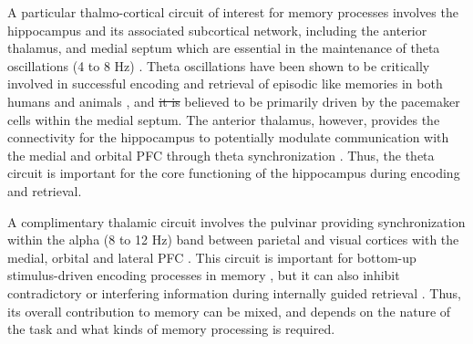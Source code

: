 \documentclass[11pt, titlepage, twoside]{article}
\providecommand{\DIFadd}[1]{{\protect\color{blue}\uwave{#1}}} %
\providecommand{\DIFdel}[1]{{\protect\color{red}\sout{#1}}}                      %
\providecommand{\DIFaddbegin}{} %
\providecommand{\DIFaddend}{} %
\providecommand{\DIFdelbegin}{} %
\providecommand{\DIFdelend}{} %
\begin{document}
A particular thalmo-cortical circuit of interest for memory processes involves the hippocampus and its associated subcortical network, including the anterior thalamus, and medial septum which are essential in the maintenance of theta oscillations (4 to 8 Hz) \cite{Buzsaki02}.  Theta oscillations have been shown to be critically involved in successful encoding and retrieval of episodic like memories in both humans and animals \cite{NyhusCurran10,JonesWilson05,FuentemillaBarnesDuzelEtAl14}, and \DIFdelbegin \DIFdel{it is }\DIFdelend \DIFaddbegin \DIFadd{are }\DIFaddend believed to be primarily driven by the pacemaker cells within the medial septum.  The anterior thalamus, however,  provides the connectivity for the hippocampus to potentially modulate communication with the medial and orbital PFC through theta synchronization \cite{VanderWerfJollesWitterEtAl03,AggletonDumontWarburton11}.  Thus, the theta circuit is important for the core functioning of the hippocampus during encoding and retrieval.


A complimentary thalamic circuit involves the pulvinar providing synchronization within the alpha (8 to 12 Hz) band between parietal and visual cortices with the medial, orbital and lateral PFC \cite{BarbasHenionDermon91,KievitKuypers77,LopesdaSilva91}.  This circuit is important for bottom-up stimulus-driven encoding processes in memory \cite{JutrasFriesBuffalo13}, but it can also inhibit contradictory or interfering information during internally guided retrieval \cite{ParkLeeKangEtAl14}.  Thus, its overall contribution to memory can be mixed, and depends on the nature of the task and what kinds of memory processing is required.

\end{document}
